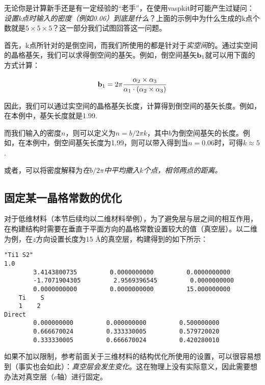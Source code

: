 \begin{extend}
    无论你是计算新手还是有一定经验的“老手”，在使用vaspkit时可能产生过疑问：\emph{设置k点时输入的密度（例如0.06）到底是什么}？上面的示例中为什么生成的k点个数就是$5\times5\times5$？这一部分我们试图回答这一问题。

    首先，k点所针对的是倒空间，而我们所使用的都是针对于\emph{实空间}的。通过实空间的晶格基矢，我们可以求得倒空间的基矢。例如，倒空间基矢$\vb{b}_1$就可以用下面的方式计算：

    \begin{equation*}
        \vb{b}_1 = 2\pi \frac{\vb{\alpha}_2\times\vb{\alpha}_3}{\vb{\alpha}_1\cdot(\vb{\alpha}_2\times\vb{\alpha}_3)}
    \end{equation*}

    因此，我们可以通过实空间的晶格基矢长度，计算得到倒空间的基矢长度。例如，在本例中，基矢长度就是1.99. 

    而我们输入的密度$n$，则可以定义为$n=b/2\pi k$，其中$b$为倒空间基矢的长度。例如，在本例中，倒空间基矢长度为1.99，则可以带入得到当$n=0.06$时，可得$k\approx5$.

    或者，可以将密度解释为\emph{在$b/2\pi$中平均撒入$k$个点，相邻两点的距离。}
\end{extend}

\subsection{固定某一晶格常数的优化}\label{subsec:对晶格常数进行优化ISIF=3-固定某一晶格常数的优化}

对于低维材料（本节后续均以二维材料举例），为了避免层与层之间的相互作用，在构建结构时需要在垂直于平面方向的晶格常数设置较大的值（真空层）。以二维为例，在$z$方向设置长度为15 Å的真空层，构建得到的如下所示：

\begin{lstlisting}[caption=POSCAR]
"Ti1 S2"
1.0
        3.4143800735         0.0000000000         0.0000000000
        -1.7071904305         2.9569396545         0.0000000000
        0.0000000000         0.0000000000         15.000000000
    Ti    S
    1    2
Direct
        0.000000000         0.000000000         0.500000000
        0.666670024         0.333330005         0.579720020
        0.333330005         0.666670024         0.420280010
\end{lstlisting}

如果不加以限制，参考前面关于三维材料的结构优化所使用的设置，可以很容易想到（事实也会如此）：\emph{真空层会发生变化}。这在物理上没有实际意义，因此需要想办法对真空层（$c$轴）进行固定。

